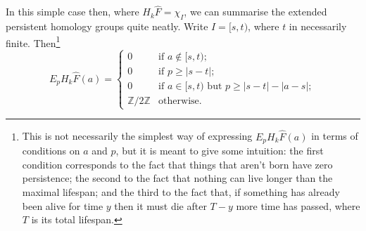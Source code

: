 \documentclass[12pt]{article}
\numberwithin{equation}{subsection}
\numberwithin{theorem}{subsection}
\numberwithin{lemma}{subsection}
\numberwithin{corollary}{subsection}
\numberwithin{definition}{subsection}
\numberwithin{example}{subsection}
\numberwithin{note}{subsection}
\newcommand{\zz}{\mathbb{Z}}
\begin{document}
            In this simple case then, where $H_k\widehat{F}=\chi_I$, we can summarise the extended persistent homology groups quite neatly.
            Write $I=[s,t)$, where $t$ in necessarily finite.
            Then\footnote{
                This is not necessarily the simplest way of expressing $E_pH_k\widehat{F}(a)$ in terms of conditions on $a$ and $p$, but it is meant to give some intuition: the first condition corresponds to the fact that things that aren't born have zero persistence; the second to the fact that nothing can live longer than the maximal lifespan; and the third to the fact that, if something has already been alive for time $y$ then it must die after $T-y$ more time has passed, where $T$ is its total lifespan.
            }
            \begin{equation}\label{eq:general-one-interval-eph}
                E_pH_k\widehat{F}(a)=
                \begin{cases}
                    0 &\mbox{if }a\not\in [s,t);\\
                    0 &\mbox{if }p\geqslant|s-t|;\\
                    0 &\mbox{if }a\in[s,t)\text{ but }p\geqslant|s-t|-|a-s|;\\
                    \zz/2\zz &\mbox{otherwise}.
                \end{cases}
            \end{equation}
\end{document}
